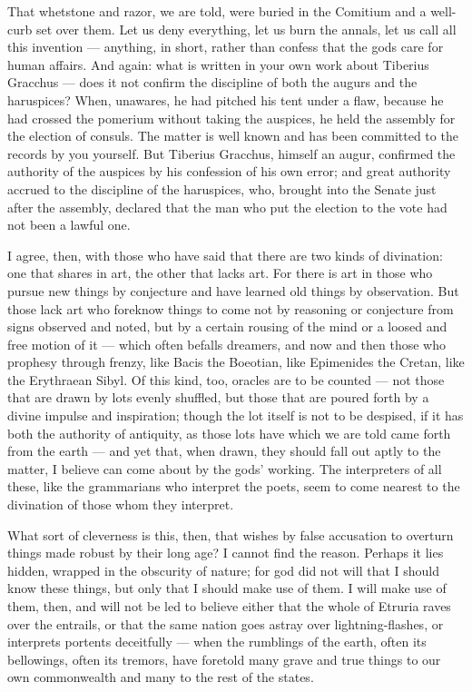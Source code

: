  That whetstone and razor, we are told, were buried in the Comitium and a well-curb set over them. Let us deny everything, let us burn the annals, let us call all this invention — anything, in short, rather than confess that the gods care for human affairs. And again: what is written in your own work about Tiberius Gracchus — does it not confirm the discipline of both the augurs and the haruspices? When, unawares, he had pitched his tent under a flaw, because he had crossed the pomerium without taking the auspices, he held the assembly for the election of consuls. The matter is well known and has been committed to the records by you yourself. But Tiberius Gracchus, himself an augur, confirmed the authority of the auspices by his confession of his own error; and great authority accrued to the discipline of the haruspices, who, brought into the Senate just after the assembly, declared that the man who put the election to the vote had not been a lawful one.

 I agree, then, with those who have said that there are two kinds of divination: one that shares in art, the other that lacks art. For there is art in those who pursue new things by conjecture and have learned old things by observation. But those lack art who foreknow things to come not by reasoning or conjecture from signs observed and noted, but by a certain rousing of the mind or a loosed and free motion of it — which often befalls dreamers, and now and then those who prophesy through frenzy, like Bacis the Boeotian, like Epimenides the Cretan, like the Erythraean Sibyl. Of this kind, too, oracles are to be counted — not those that are drawn by lots evenly shuffled, but those that are poured forth by a divine impulse and inspiration; though the lot itself is not to be despised, if it has both the authority of antiquity, as those lots have which we are told came forth from the earth — and yet that, when drawn, they should fall out aptly to the matter, I believe can come about by the gods' working. The interpreters of all these, like the grammarians who interpret the poets, seem to come nearest to the divination of those whom they interpret.

 What sort of cleverness is this, then, that wishes by false accusation to overturn things made robust by their long age? I cannot find the reason. Perhaps it lies hidden, wrapped in the obscurity of nature; for god did not will that I should know these things, but only that I should make use of them. I will make use of them, then, and will not be led to believe either that the whole of Etruria raves over the entrails, or that the same nation goes astray over lightning-flashes, or interprets portents deceitfully — when the rumblings of the earth, often its bellowings, often its tremors, have foretold many grave and true things to our own commonwealth and many to the rest of the states.

